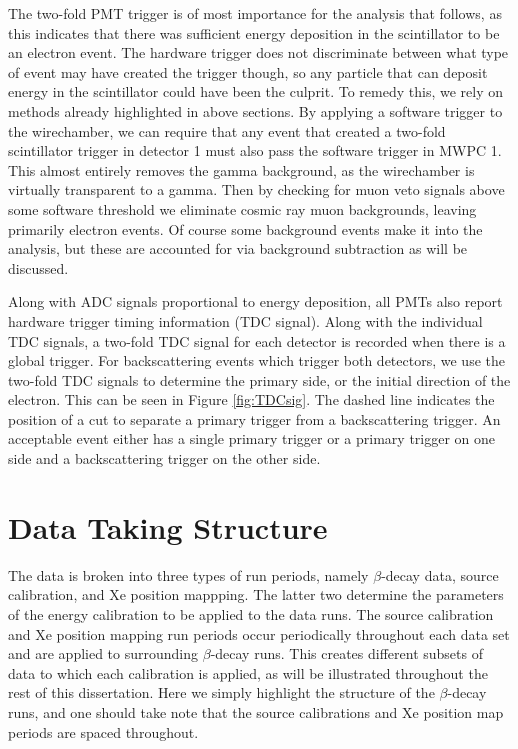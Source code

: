 
The two-fold PMT trigger is of most importance for the analysis that follows, as this indicates
that there was sufficient energy deposition in the scintillator to be an electron event.
The hardware trigger does not
discriminate between what type of event may have created the trigger though, so any particle
that can deposit energy in the scintillator could have been the culprit. To remedy this, we rely
on methods already highlighted in above sections. By applying a software trigger to
the wirechamber, we can require that any event that created a two-fold scintillator trigger
in detector 1 must also pass the software trigger in MWPC 1. This almost entirely removes the
gamma background, as the wirechamber is virtually transparent to a gamma.
Then by checking for muon veto signals above some software threshold we eliminate
cosmic ray muon backgrounds, leaving primarily electron events. Of course
some background events make it into the analysis, but these are accounted for
via background subtraction as will be discussed.

Along with ADC signals proportional to energy deposition, all PMTs also report hardware trigger
timing information (TDC signal). Along with the individual TDC signals, a two-fold TDC signal for
each detector is recorded when there is a global trigger.
For backscattering events which trigger both detectors, we use the two-fold TDC signals
to determine the primary side, or the initial direction of the electron. This can be seen in
Figure \ref{fig:TDCsig}. The dashed line indicates the position of a cut to separate a primary trigger
from a backscattering trigger. An acceptable event either has a single primary trigger or a primary
trigger on one side and a backscattering trigger on the other side. 





\section{Data Taking Structure}

The data is broken into three types of run periods, namely $\beta$-decay data, source calibration, and
Xe position mappping. The latter two determine the parameters of the energy calibration to be
applied to the data runs. The source calibration and Xe position mapping run periods
occur periodically throughout each data set and are applied to surrounding $\beta$-decay runs. This
creates different subsets of data to which each calibration is applied, as will be illustrated
throughout the rest of this dissertation. Here we simply highlight the structure of the
$\beta$-decay runs, and one should take note that the source calibrations and Xe position map periods
are spaced throughout.

